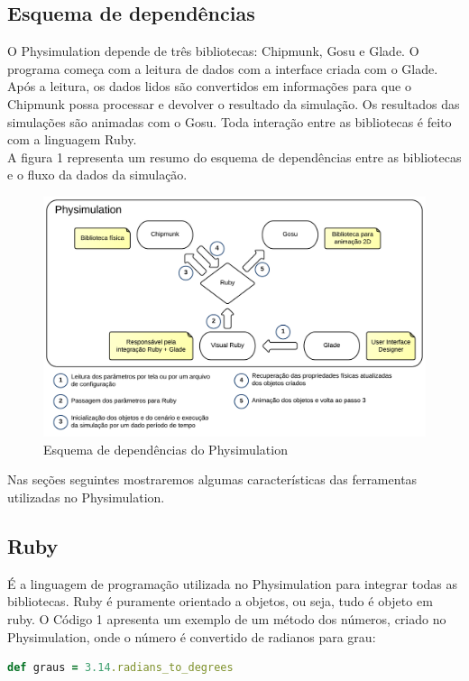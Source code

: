 \subsection{Esquema de dependências}
O Physimulation depende de três bibliotecas: Chipmunk, Gosu e Glade. O programa começa com a leitura de dados com a interface criada com o Glade. Após a leitura, 
os dados lidos são convertidos em informações para que o Chipmunk possa processar e devolver o resultado da simulação. Os resultados das simulações são animadas 
com o Gosu. Toda interação entre as bibliotecas é feito com a linguagem Ruby. \\

A figura 1 representa um resumo do esquema de dependências entre as bibliotecas e o fluxo da dados da simulação.

\begin{figure}[!htbp]
  \includegraphics[scale=0.2]{EsquemaDependencia.png}
  \caption{Esquema de dependências do Physimulation}
\end{figure}

Nas seções seguintes mostraremos algumas características das ferramentas utilizadas no Physimulation.

\subsection{Ruby}
É a linguagem de programação utilizada no Physimulation para integrar todas as bibliotecas.
Ruby é puramente orientado a objetos, ou seja, tudo é objeto em ruby. O Código 1 apresenta um exemplo de um método dos números, criado no Physimulation, onde o 
número é convertido de radianos para grau:

\begin{lstlisting}[language=Ruby, caption=Conversão de radianos em graus]
  def graus = 3.14.radians_to_degrees
\end{lstlisting} 

